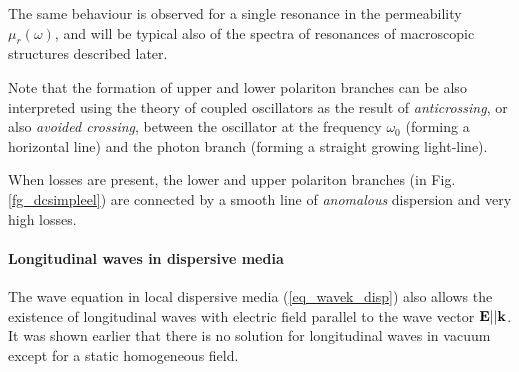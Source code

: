 The same behaviour is observed for a single resonance in the permeability $\mu_r(\omega)$, and will be typical also of the spectra of resonances of macroscopic structures described later.

Note that the formation of upper and lower polariton branches can be also interpreted \cite{landau1984electrodynamics} using the theory of coupled oscillators as the result of \textit{anticrossing}, or also \textit{avoided crossing}, between the oscillator at the frequency $\omega_0$ (forming a horizontal line) and the photon branch (forming a straight growing light-line). \label{anticrossing}

When losses are present, the lower and upper polariton branches (in Fig. \ref{fg_dcsimpleel}) are connected by a smooth line of \textit{anomalous} dispersion and very high losses.  

\paragraph{Longitudinal waves in dispersive media} %
The wave equation in local dispersive media (\ref{eq_wavek_disp}) 
also allows the existence of longitudinal waves with electric field parallel to the wave vector $\mathbf{E} || {\mathbf{k}}$. It was shown earlier that there is no solution for longitudinal waves in vacuum except for a static homogeneous field.

